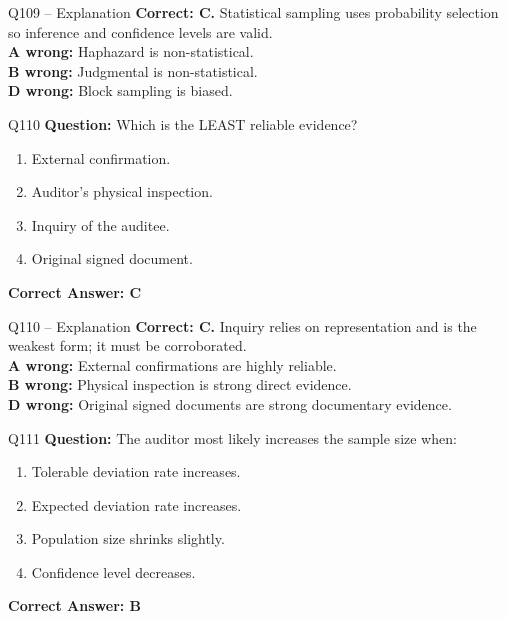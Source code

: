\documentclass[aspectratio=169,10pt]{beamer}
\begin{document}
	\begin{frame}[t]{Q109 -- Explanation}
		\small
		\textbf{Correct: C.} Statistical sampling uses probability selection so inference and confidence levels are valid. \\[4pt]
		\textbf{A wrong:} Haphazard is non-statistical. \\[2pt]
		\textbf{B wrong:} Judgmental is non-statistical. \\[2pt]
		\textbf{D wrong:} Block sampling is biased.
	\end{frame}
	
	\begin{frame}[t]{Q110}
		\small
		\textbf{Question:} Which is the LEAST reliable evidence?
		\begin{enumerate}[label=\Alph*.,itemsep=1pt,topsep=2pt]
			\item External confirmation.
			\item Auditor's physical inspection.
			\item Inquiry of the auditee.
			\item Original signed document.
		\end{enumerate}
		\vspace{4pt}
		\textbf{Correct Answer: C}
	\end{frame}
	
	\begin{frame}[t]{Q110 -- Explanation}
		\small
		\textbf{Correct: C.} Inquiry relies on representation and is the weakest form; it must be corroborated. \\[4pt]
		\textbf{A wrong:} External confirmations are highly reliable. \\[2pt]
		\textbf{B wrong:} Physical inspection is strong direct evidence. \\[2pt]
		\textbf{D wrong:} Original signed documents are strong documentary evidence.
	\end{frame}
	
	\begin{frame}[t]{Q111}
		\small
		\textbf{Question:} The auditor most likely increases the sample size when:
		\begin{enumerate}[label=\Alph*.,itemsep=1pt,topsep=2pt]
			\item Tolerable deviation rate increases.
			\item Expected deviation rate increases.
			\item Population size shrinks slightly.
			\item Confidence level decreases.
		\end{enumerate}
		\vspace{4pt}
		\textbf{Correct Answer: B}
	\end{frame}
	
\end{document}
